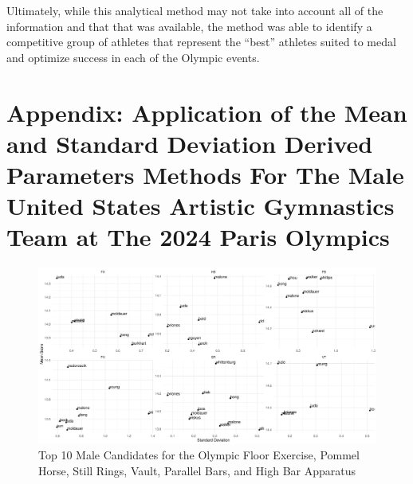\documentclass[12pt]{article}
\begin{document}
Ultimately, while this analytical method may not take into account all of the information and that that was available, 
the method was able to identify a competitive group of athletes that represent the ``best'' athletes suited 
to medal and optimize success in each of the Olympic events.


\appendix

\section{Appendix: Application of the Mean and Standard Deviation Derived Parameters Methods For The Male 
United States Artistic Gymnastics Team at The 2024 Paris Olympics}

\begin{figure}
  \centering
  \includegraphics[scale=0.5]{MaleAthleteApparatus.pdf}
  \caption{Top 10 Male Candidates for the Olympic Floor Exercise, Pommel Horse, Still Rings, Vault, Parallel Bars, 
  and High Bar Apparatus}
  \label{fig:MA}
\end{figure}
\end{document}
